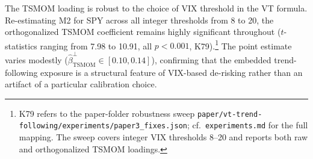 The TSMOM loading is robust to the choice of VIX threshold in the VT formula. Re-estimating M2 for SPY across all integer thresholds from 8 to 20, the orthogonalized TSMOM coefficient remains highly significant throughout ($t$-statistics ranging from 7.98 to 10.91, all $p < 0.001$, K79).\footnote{K79 refers to the paper-folder robustness sweep \texttt{paper/vt-trend-following/experiments/paper3\_fixes.json}; cf.~\texttt{experiments.md} for the full mapping. The sweep covers integer VIX thresholds 8--20 and reports both raw and orthogonalized TSMOM loadings.} The point estimate varies modestly ($\hat{\beta}_{\text{TSMOM}}^{\perp} \in [0.10, 0.14]$), confirming that the embedded trend-following exposure is a structural feature of VIX-based de-risking rather than an artifact of a particular calibration choice.


